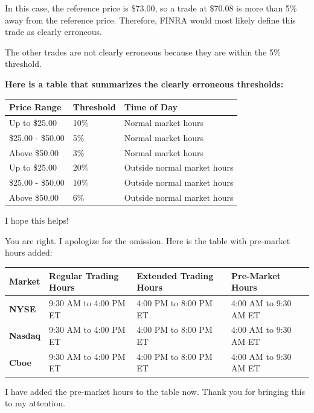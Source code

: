 \documentclass[11pt]{article}
\begin{document}
In this case, the reference price is \$73.00, so a trade at \$70.08 is more than 5\% away from the reference price. Therefore, FINRA would most likely define this trade as clearly erroneous.

The other trades are not clearly erroneous because they are within the 5\% threshold.

\textbf{\textbf{Here is a table that summarizes the clearly erroneous thresholds:}}

\begin{center}
\begin{tabular}{lll}
\textbf{\textbf{Price Range}} & \textbf{\textbf{Threshold}} & \textbf{\textbf{Time of Day}}\\[0pt]
\hline
Up to \$25.00 & 10\% & Normal market hours\\[0pt]
\$25.00 - \$50.00 & 5\% & Normal market hours\\[0pt]
Above \$50.00 & 3\% & Normal market hours\\[0pt]
Up to \$25.00 & 20\% & Outside normal market hours\\[0pt]
\$25.00 - \$50.00 & 10\% & Outside normal market hours\\[0pt]
Above \$50.00 & 6\% & Outside normal market hours\\[0pt]
\end{tabular}
\end{center}

I hope this helps!




You are right. I apologize for the omission. Here is the table with pre-market hours added:

\begin{center}
\begin{tabular}{llll}
\textbf{\textbf{Market}} & \textbf{\textbf{Regular Trading Hours}} & \textbf{\textbf{Extended Trading Hours}} & \textbf{\textbf{Pre-Market Hours}}\\[0pt]
\hline
\textbf{\textbf{NYSE}} & 9:30 AM to 4:00 PM ET & 4:00 PM to 8:00 PM ET & 4:00 AM to 9:30 AM ET\\[0pt]
\textbf{\textbf{Nasdaq}} & 9:30 AM to 4:00 PM ET & 4:00 PM to 8:00 PM ET & 4:00 AM to 9:30 AM ET\\[0pt]
\textbf{\textbf{Cboe}} & 9:30 AM to 4:00 PM ET & 4:00 PM to 8:00 PM ET & 4:00 AM to 9:30 AM ET\\[0pt]
\end{tabular}
\end{center}

I have added the pre-market hours to the table now. Thank you for bringing this to my attention.
\end{document}
